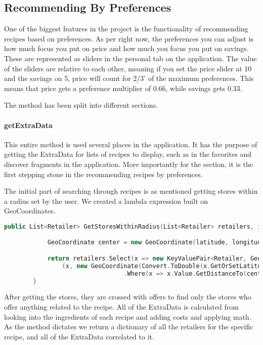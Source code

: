 \subsection{Recommending By Preferences}
\label{subsec:searchbypref}

One of the biggest features in the project is the functionality of recommending recipes based on preferences. As per right now, the preferences you can adjust is how much focus you put on price and how much you focus you put on savings. These are represented as sliders in the personal tab on the application. The value of the sliders are relative to each other, meaning if you set the price slider at 10 and the savings on 5, price will count for 2/3' of the maximum preferences. This means that price gets a preference multiplier of 0.66, while savings gets 0.33.

The method has been split into different sections.

\paragraph{getExtraData} This entire method is used several places in the application. It has the purpose of getting the ExtraData for lists of recipes to display, such as in the favorites and discover fragments in the application. More importantly for the section, it is the first stepping stone in the recommending recipes by preferences.

The initial part of searching through recipes is as mentioned getting stores within a radius set by the user. We created a lambda expression built on GeoCoordinates.

\begin{lstlisting}[language=c++]
 public List<Retailer> GetStoresWithinRadius(List<Retailer> retailers, int radius, double latitude, double longitude) {

            GeoCoordinate center = new GeoCoordinate(latitude, longitude);

            return retailers.Select(x => new KeyValuePair<Retailer, GeoCoordinate>
				(x, new GeoCoordinate(Convert.ToDouble(x.GetOrSetLatitude), Convert.ToDouble(x.GetOrSetLongitude))))
                                 .Where(x => x.Value.GetDistanceTo(center) < radius).ToDictionary(x => x.Key, x => x.Value).Keys.ToList();
        }
\end{lstlisting}

After getting the stores, they are crossed with offers to find only the stores who offer anything related to the recipe. All of the ExtraData is calculated from looking into the ingredients of each recipe and adding costs and applying math. As the method dictates we return a dictionary of all the retailers for the specific recipe, and all of the ExtraData correlated to it.

